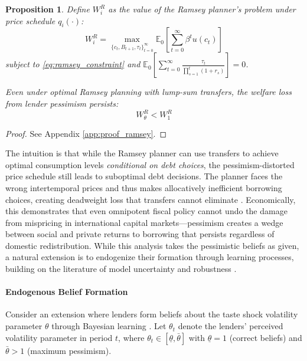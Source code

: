 \documentclass[12pt]{article}
\theoremstyle{plain}
\newtheorem{proposition}{Proposition}
\begin{document}
\begin{proposition}\label{prop:ramsey_welfare}
	Define $W^R_i$ as the value of the Ramsey planner's problem under price schedule $q_i(\cdot)$:
	\begin{equation}
		W^R_i = \max_{\{c_t, B_{t+1}, \tau_t\}_{t=0}^\infty} \mathbb{E}_0 \left[ \sum_{t=0}^\infty \beta^t u(c_t) \right] \label{eq:ramsey_welfare_def}
	\end{equation}
	subject to \eqref{eq:ramsey_constraint} and $\mathbb{E}_0 \left[ \sum_{t=0}^\infty \frac{\tau_t}{\prod_{s=1}^t (1+r_s)} \right] = 0$.

	Even under optimal Ramsey planning with lump-sum transfers, the welfare loss
	from lender pessimism persists:
	\begin{equation}
		W^R_\theta < W^R_1 \label{eq:ramsey_welfare_loss}
	\end{equation}
\end{proposition}

\begin{proof}
	See Appendix \ref{app:proof_ramsey}.
\end{proof}
The intuition is that while the Ramsey planner can use transfers to achieve
optimal consumption levels \textit{conditional on debt choices}, the
pessimism-distorted price schedule still leads to suboptimal debt decisions.
The planner faces the wrong intertemporal prices and thus makes allocatively
inefficient borrowing choices, creating deadweight loss that transfers cannot
eliminate \citep{AiyagariMarcetSargentSeppala2002}. Economically, this demonstrates that even omnipotent fiscal policy cannot undo the damage from mispricing in international capital markets---pessimism creates a wedge between social and private returns to borrowing that persists regardless of domestic redistribution. While this analysis takes the pessimistic beliefs as given, a natural extension is to endogenize their formation through learning processes, building on the literature of model uncertainty and robustness \citep{HansenSargent2001}.

\paragraph{Endogenous Belief Formation}

Consider an extension where lenders form beliefs about the taste shock
volatility parameter $\theta$ through Bayesian learning
\citep{CogleySargent2008}. Let $\theta_t$ denote the lenders' perceived
volatility parameter in period $t$, where $\theta_t \in [\underline{\theta},
		\bar{\theta}]$ with $\underline{\theta} = 1$ (correct beliefs) and
$\bar{\theta} > 1$ (maximum pessimism).
\end{document}

